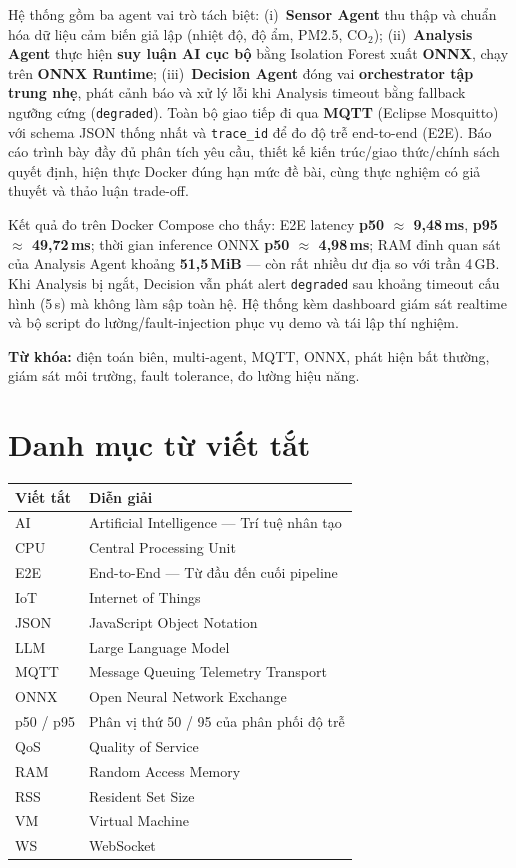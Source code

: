 \documentclass[12pt,a4paper,oneside]{report}
\newcommand{\code}[1]{\texttt{#1}}
\begin{document}
Hệ thống gồm ba agent vai trò tách biệt: (i)~\textbf{Sensor Agent} thu thập và chuẩn hóa dữ liệu cảm biến giả lập (nhiệt độ, độ ẩm, PM2.5, CO$_2$); (ii)~\textbf{Analysis Agent} thực hiện \textbf{suy luận AI cục bộ} bằng Isolation Forest xuất \textbf{ONNX}, chạy trên \textbf{ONNX Runtime}; (iii)~\textbf{Decision Agent} đóng vai \textbf{orchestrator tập trung nhẹ}, phát cảnh báo và xử lý lỗi khi Analysis timeout bằng fallback ngưỡng cứng (\code{degraded}). Toàn bộ giao tiếp đi qua \textbf{MQTT} (Eclipse Mosquitto) với schema JSON thống nhất và \code{trace\_id} để đo độ trễ end-to-end (E2E). Báo cáo trình bày đầy đủ phân tích yêu cầu, thiết kế kiến trúc/giao thức/chính sách quyết định, hiện thực Docker đúng hạn mức đề bài, cùng thực nghiệm có giả thuyết và thảo luận trade-off.

Kết quả đo trên Docker Compose cho thấy: E2E latency \textbf{p50 $\approx$ 9,48\,ms}, \textbf{p95 $\approx$ 49,72\,ms}; thời gian inference ONNX \textbf{p50 $\approx$ 4,98\,ms}; RAM đỉnh quan sát của Analysis Agent khoảng \textbf{51,5\,MiB} --- còn rất nhiều dư địa so với trần 4\,GB. Khi Analysis bị ngắt, Decision vẫn phát alert \code{degraded} sau khoảng timeout cấu hình (5\,s) mà không làm sập toàn hệ. Hệ thống kèm dashboard giám sát realtime và bộ script đo lường/fault-injection phục vụ demo và tái lập thí nghiệm.

\vspace{1em}
\noindent\textbf{Từ khóa:} điện toán biên, multi-agent, MQTT, ONNX, phát hiện bất thường, giám sát môi trường, fault tolerance, đo lường hiệu năng.
\newpage
\tableofcontents
\newpage
\listoffigures
\newpage
\listoftables
\newpage
\chapter*{Danh mục từ viết tắt}

\begin{tabularx}{\textwidth}{@{}lX@{}}
\toprule
\textbf{Viết tắt} & \textbf{Diễn giải} \\
\midrule
AI   & Artificial Intelligence --- Trí tuệ nhân tạo \\
CPU  & Central Processing Unit \\
E2E  & End-to-End --- Từ đầu đến cuối pipeline \\
IoT  & Internet of Things \\
JSON & JavaScript Object Notation \\
LLM  & Large Language Model \\
MQTT & Message Queuing Telemetry Transport \\
ONNX & Open Neural Network Exchange \\
p50 / p95 & Phân vị thứ 50 / 95 của phân phối độ trễ \\
QoS  & Quality of Service \\
RAM  & Random Access Memory \\
RSS  & Resident Set Size \\
VM   & Virtual Machine \\
WS   & WebSocket \\
\bottomrule
\end{tabularx}
\end{document}
